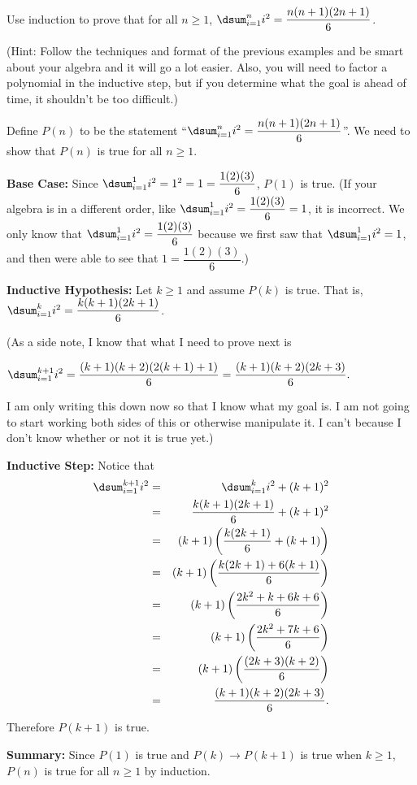 \begin{exer}
Use induction to prove that for all $n\geq 1$, 
$\dsum _{i=1}^n i^2 = \dfrac{n(n+1)(2n+1)}{6}$.

\noindent
(Hint: Follow the techniques and format of the previous examples and 
be smart about your algebra and it will go a lot easier.
Also, you will need to factor a polynomial in the inductive step, 
but if you determine what the goal is ahead of time, it shouldn't
be too difficult.)

\vspace*{6.5in}
\begin{answer}
Define $P(n)$ to be the statement ``$\dsum _{i=1}^n i^2 = \dfrac{n(n+1)(2n+1)}{6}$''.
We need to show that $P(n)$ is true for all $n\geq 1$.

\noindent
{\bf Base Case:} 
Since $\dsum _{i=1}^1 i^2 = 1^2 = 1 =  \dfrac{1(2)(3)}{6}$,
$P(1)$ is true. (If your algebra is in a different order, like 
$\dsum _{i=1}^1 i^2 = \dfrac{1(2)(3)}{6}= 1$, it is incorrect.  We only know that 
$\dsum _{i=1}^1 i^2 = \dfrac{1(2)(3)}{6}$ because we first saw that $\dsum _{i=1}^1 i^2=1$,
and then were able to see that $1 =  \dfrac{1(2)(3)}{6}$.)

\noindent
{\bf Inductive Hypothesis:}
Let $k\geq 1$ and assume $P(k)$ is true.  That is, $\dsum _{i=1}^k i^2 = \dfrac{k(k+1)(2k+1)}{6}$.

\noindent
(As a side note, I know that what I need to prove next is

\noindent
$\displaystyle\dsum _{i=1}^{k+1} i^2 = \dfrac{(k+1)(k+2)(2(k+1)+1)}{6}=\dfrac{(k+1)(k+2)(2k+3)}{6}.$

\noindent
I am only writing this down now so that I know what my goal is.  I am not going to start working
both sides of this or otherwise manipulate it.  I can't because I don't know whether or not it is
true yet.)

\noindent
{\bf Inductive Step:}
Notice that 
\begin{eqnarray*}
\dsum _{i=1}^{k+1} i^2&=&\dsum _{i=1}^k i^2+(k+1)^2\\
&=&\dfrac{k(k+1)(2k+1)}{6}+(k+1)^2\\
&=&(k+1)\left(\dfrac{k(2k+1)}{6}+(k+1)\right)\\
&=&(k+1)\left(\dfrac{k(2k+1)+6(k+1)}{6}\right)\\
&=&(k+1)\left(\dfrac{2k^2 + k + 6k+ 6}{6}\right)\\
&=&(k+1)\left(\dfrac{2k^2 + 7k+ 6}{6}\right)\\
&=&(k+1)\left(\dfrac{(2k+3)(k+2)}{6}\right)\\
&=&\dfrac{(k+1)(k+2)(2k+3)}{6}.
\end{eqnarray*}
Therefore $P(k+1)$ is true.

\noindent
{\bf Summary:} Since $P(1)$ is true and $P(k)\rightarrow P(k+1)$ is true when $k\geq 1$,
$P(n)$ is true for all $n\geq 1$ by induction.
\end{answer}
\end{exer}

